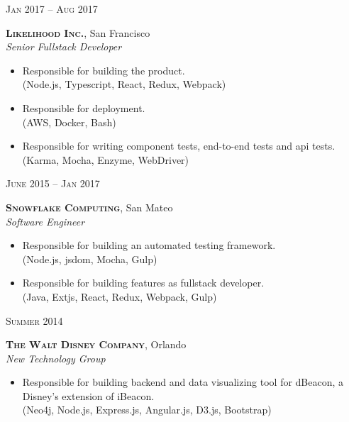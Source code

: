 \documentclass[10pt]{article}
\begin{document}
{\begin{minipage}[t]{0.5\textwidth}
{\raggedleft\textsc{Jan 2017 -- Aug 2017}\par}

{\raggedright\large \textbf{\textsc{Likelihood Inc.}}, San Francisco\\
\textit{Senior Fullstack Developer}\\[5pt]}

\begin{itemize}
	\item Responsible for building the product. \\
	{\color{Mahogany}(Node.js, Typescript, React, Redux, Webpack)}
	\item Responsible for deployment. \\
	{\color{Mahogany}(AWS, Docker, Bash)}
	\item Responsible for writing component tests, end-to-end tests and api tests. \\
	{\color{Mahogany}(Karma, Mocha, Enzyme, WebDriver)}
\end{itemize}

{\raggedleft\textsc{June 2015 -- Jan 2017}\par}

{\raggedright\large \textbf{\textsc{Snowflake Computing}}, San Mateo\\
\textit{Software Engineer}\\[5pt]}

\begin{itemize}
	\item Responsible for building an automated testing framework. \\
	{\color{Mahogany}(Node.js, jsdom, Mocha, Gulp)}
	\item Responsible for building features as fullstack developer. \\
	{\color{Mahogany}(Java, Extjs, React, Redux, Webpack, Gulp)}
\end{itemize}

{\raggedleft\textsc{Summer 2014}\par}

{\raggedright\large \textbf{\textsc{The Walt Disney Company}}, Orlando\\
\textit{New Technology Group}\\[5pt]}

\begin{itemize}
	\item Responsible for building backend and data visualizing tool for dBeacon, a Disney's extension of iBeacon. \\
	{\color{Mahogany}(Neo4j, Node.js, Express.js, Angular.js, D3.js, Bootstrap)}
\end{itemize}


\end{minipage}}
\end{document}
